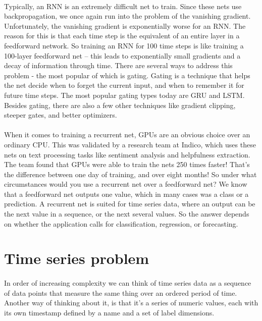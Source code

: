 \documentclass{article}
\begin{document}
    \paragraph{}
    Typically, an RNN is an extremely difficult  net to train. Since these nets use backpropagation,  we once again run into the problem of the  vanishing gradient. Unfortunately, the vanishing  gradient is exponentially worse for an RNN.  The reason for this is that each time step  is the equivalent of an entire layer in a  feedforward network. So training an RNN for  100 time steps is like training a 100-layer  feedforward net – this leads to exponentially  small gradients and a decay of information  through time.  There are several ways to address this problem  - the most popular of which is gating. Gating  is a technique that helps the net decide when  to forget the current input, and when to remember  it for future time steps. The most popular  gating types today are GRU and LSTM. Besides  gating, there are also a few other techniques  like gradient clipping, steeper gates, and  better optimizers.
    \paragraph{}
    When it comes to training a recurrent net,  GPUs are an obvious choice over an ordinary  CPU. This was validated by a research team  at Indico, which uses these nets on text processing  tasks like sentiment analysis and helpfulness  extraction. The team found that GPUs were  able to train the nets 250 times faster! That’s  the difference between one day of training,  and over eight months!  So under what circumstances would you use  a recurrent net over a feedforward net? We  know that a feedforward net outputs one value,  which in many cases was a class or a prediction.  A recurrent net is suited for time series  data, where an output can be the next value  in a sequence, or the next several values.  So the answer depends on whether the application  calls for classification, regression, or forecasting.

    \newpage
    \section{Time series problem}
    \paragraph{}
    In order of increasing complexity we can think of time series data as a sequence of data points that measure the same thing over an ordered period of time. Another way of thinking about it, is that it's a series of numeric values, each with its own timestamp defined by a name and a set of label dimensions.
\end{document}
